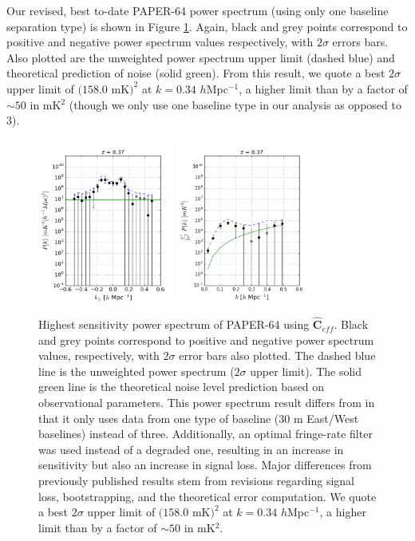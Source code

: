 \documentclass[preprint2,numberedappendix,tighten]{aastex6}  %
\begin{document}
Our revised, best to-date PAPER-64 power spectrum (using only one baseline separation type) is shown in Figure \ref{fig:ps1_data}. Again, black and grey points correspond to positive and negative power spectrum values respectively, with $2\sigma$ errors bars. Also plotted are the unweighted power spectrum upper limit (dashed blue) and theoretical prediction of noise (solid green). From this result, we quote a best $2\sigma$ upper limit of $(158.0$ mK$)^{2}$ at $k=0.34$ $h$Mpc$^{-1}$, a higher limit than \citet{ali_et_al2015} by a factor of $\sim50$ in mK$^{2}$ (though we only use one baseline type in our analysis as opposed to $3$).

\begin{figure}
	\centering
	\includegraphics[width=0.4\textwidth]{plots/ps1_data_reg.png}
	\includegraphics[width=0.4\textwidth]{plots/ps2_data_reg.png}
	\caption{Highest sensitivity power spectrum of PAPER-64 using $\hat{\textbf{C}}_{eff}$. Black and grey points correspond to positive and negative power spectrum values, respectively, with $2\sigma$ error bars also plotted. The dashed blue line is the unweighted power spectrum ($2\sigma$ upper limit). The solid green line is the theoretical noise level prediction based on observational parameters. This power spectrum result differs from \citet{ali_et_al2015} in that it only uses data from one type of baseline ($30$ m East/West baselines) instead of three. Additionally, an optimal fringe-rate filter was used instead of a degraded one, resulting in an increase in sensitivity but also an increase in signal loss. Major differences from previously published results stem from revisions regarding signal loss, bootstrapping, and the theoretical error computation. We quote a best $2\sigma$ upper limit of $(158.0$ mK$)^{2}$ at $k=0.34$ $h$Mpc$^{-1}$, a higher limit than \citet{ali_et_al2015} by a factor of $\sim50$ in mK$^{2}$.}
	\label{fig:ps1_data}
\end{figure}
\end{document}

